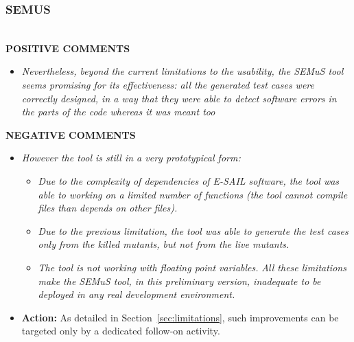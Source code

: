 \subsubsection{SEMUS} \ \\ 

\textbf{POSITIVE COMMENTS} 
 
\begin{itemize}
\item \emph{Nevertheless, beyond the current limitations to the usability, the SEMuS tool seems promising for its effectiveness: all the generated test cases were correctly designed, in a way that they were able to detect software errors in the parts of the code whereas it was meant too} 
\end{itemize}
 
\textbf{NEGATIVE COMMENTS}
 \begin{itemize}
\item \emph{However the tool is still in a very prototypical form:} 
\begin{itemize}
\item \emph{Due to the complexity of dependencies of E-SAIL software, the tool was able to working on a limited number of functions (the tool cannot compile files than depends on other files).}  
\item \emph{Due to the previous limitation, the tool was able to generate the test cases only from the killed mutants, but not from the live mutants.}  
\item \emph{The tool is not working with floating point variables.}  
\emph{All these limitations make the SEMuS tool, in this preliminary version, inadequate to be deployed in any real development environment. }
\end{itemize}
\item \textbf{Action:} As detailed in Section~\ref{sec:limitations}, such improvements can be targeted only by a dedicated follow-on activity. 
\end{itemize}
\ENDCHANGEDWPT